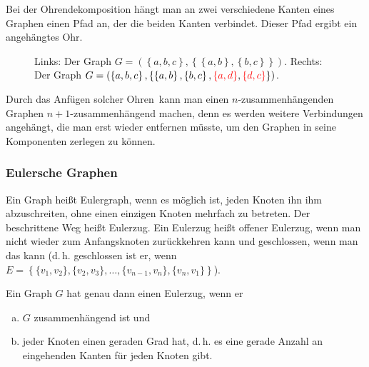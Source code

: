 \documentclass{scrartcl}
\begin{document}
Bei der Ohrendekomposition hängt man an zwei verschiedene Kanten eines Graphen 
einen Pfad an, der die beiden Kanten verbindet. Dieser Pfad ergibt ein angehängtes
\frq Ohr\flq.

\begin{figure}[h!]
\centering
\begin{subfigure}{.5\textwidth}
\end{subfigure}%
\begin{subfigure}{.5\textwidth}
\end{subfigure}
\caption{Links: Der Graph $G = \left(\left\{a, b, c\right\},
	\left\{
		\left\{a, b\right\}, 
		\left\{b, c\right\}
	\right\}
	\right)$. Rechts: Der Graph $G = \left(\left\{a, b, c\right\},
	\left\{
		\left\{a, b\right\}, 
		\left\{b, c\right\},
		\textcolor{red}{\left\{a, d\right\}},
		\textcolor{red}{\left\{d, c\right\}}
	\right\}
	\right)$.}
\label{ohrendekomposition}
\end{figure}

Durch das Anfügen solcher \frq Ohren\flq\ kann man einen $n$-zusammenhängenden Graphen $n + 1$-zusammenhängend machen, denn es werden weitere Verbindungen angehängt, die man
erst wieder entfernen müsste, um den Graphen in seine Komponenten zerlegen zu können.

\subsubsection{Eulersche Graphen}

Ein Graph heißt Eulergraph, wenn es möglich ist, jeden Knoten ihn ihm abzuschreiten, ohne einen einzigen Knoten 
mehrfach zu betreten. Der beschrittene Weg heißt \frq Eulerzug\flq. Ein Eulerzug heißt offener Eulerzug, wenn
man nicht wieder zum Anfangsknoten zurückkehren kann und geschlossen, wenn man das kann (d.\,h. geschlossen
ist er, wenn $E = \left\{ \{v_1, v_2\}, \{v_2, v_3\}, \dots, \{v_{n - 1}, v_n\}, \{v_n, v_1\} \right\}$).

Ein Graph $G$ hat genau dann einen Eulerzug, wenn er

\begin{enumerate}[(a)]
	\item $G$ zusammenhängend ist und
	\item jeder Knoten einen geraden Grad hat, d.\,h. es eine gerade Anzahl an eingehenden Kanten für jeden
		Knoten gibt.
\end{enumerate}
\end{document}
